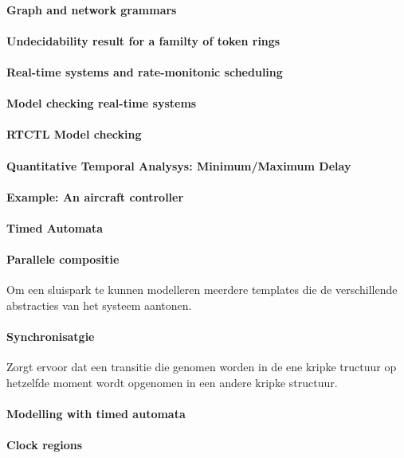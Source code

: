 \paragraph{Graph and network grammars}
\paragraph{Undecidability result for a familty of token rings}
\paragraph{Real-time systems and rate-monitonic scheduling}
\paragraph{Model checking real-time systems}
\paragraph{RTCTL Model checking}
\paragraph{Quantitative Temporal Analysys: Minimum/Maximum Delay}
\paragraph{Example: An aircraft controller}
\paragraph{Timed Automata}
\paragraph{Parallele compositie}
Om een sluispark te kunnen modelleren meerdere templates die de verschillende abstracties van het systeem aantonen.

\paragraph{Synchronisatgie}
Zorgt ervoor dat  een transitie die genomen worden in de ene kripke tructuur op hetzelfde moment wordt opgenomen in een andere kripke structuur.

\paragraph{Modelling with timed automata}
\paragraph{Clock regions}
